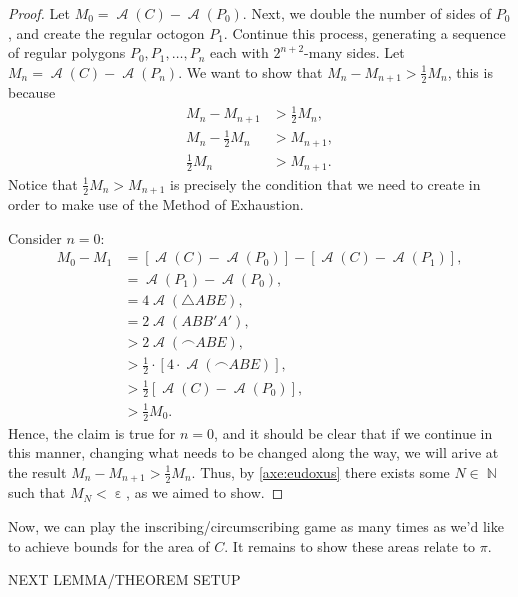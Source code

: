 \documentclass[letterpaper, 12pt]{amsart}
\DeclareMathOperator{\N}{\mathbb{N}}
\DeclareMathOperator{\A}{\mathcal{A}}
\DeclareMathOperator{\ep}{\varepsilon}
\theoremstyle{definition}  %
\begin{document}
\begin{proof}
		Let $M_{0} = \A(C) - \A(P_{0})$.
		Next, we double the number of sides of $P_{0}$, and create the regular octogon $P_{1}$.
		Continue this process, generating a sequence of regular polygons $P_{0}, P_{1}, \dots, P_{n}$ each with $2^{n+2}$-many sides.
		Let $M_{n} = \A(C) - \A(P_{n})$.
		We want to show that $M_{n} - M_{n+1} > \tfrac{1}{2}M_{n}$, this is because 
			\begin{align*}
			M_{n} - M_{n+1} &> \tfrac{1}{2}M_{n}, \\
			M_{n} - \tfrac{1}{2}M_{n} &> M_{n+1}, \\
			\tfrac{1}{2}M_{n} &> M_{n+1}.
			\end{align*}
		Notice that $\tfrac{1}{2}M_{n} > M_{n+1}$ is precisely the condition that we need to create in order to make use of the Method of Exhaustion.

		Consider $n = 0$:
			\begin{align*}
			M_{0} - M_{1} &= [\A(C) - \A(P_{0})] - [\A(C) - \A(P_{1})], \\
			&= \A(P_{1}) - \A(P_{0}), \\
			&= 4 \A(\triangle ABE), \\
			&= 2 \A(ABB'A'), \\
			&> 2 \A(\frown{ABE}), \\
			&> \tfrac{1}{2} \cdot \left[ 4 \cdot \A(\frown{ABE}) \right], \\
			&> \tfrac{1}{2} \left[ \A(C) - \A(P_{0}) \right], \\
			&> \tfrac{1}{2} M_{0}.
			\end{align*}
		Hence, the claim is true for $n=0$, and it should be clear that if we continue in this manner, changing what needs to be changed along the way, we will arive at the result $M_{n} - M_{n+1} > \tfrac{1}{2}M_{n}$.
		Thus, by \ref{axe:eudoxus} there exists some $N \in \N$ such that $M_{N} < \ep$, as we aimed to show.
		\end{proof}

		Now, we can play the inscribing/circumscribing game as many times as we'd like to achieve bounds for the area of $C$.
		It remains to show these areas relate to $\pi$.

		\vspace{5mm}

		NEXT LEMMA/THEOREM SETUP

		\vspace{5mm}
\end{document}
